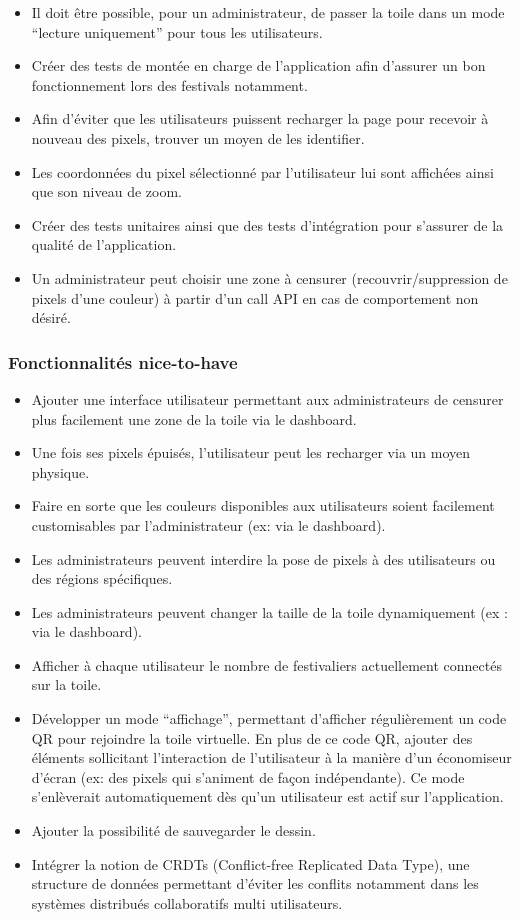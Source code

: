 \begin{itemize}
  \item Il doit être possible, pour un administrateur, de passer la toile dans un mode “lecture uniquement” pour tous les utilisateurs.
  \item Créer des tests de montée en charge de l'application afin d'assurer un bon fonctionnement lors des festivals notamment.
  \item Afin d'éviter que les utilisateurs puissent recharger la page pour recevoir à nouveau des pixels, trouver un moyen de les identifier.
  \item Les coordonnées du pixel sélectionné par l'utilisateur lui sont affichées ainsi que son niveau de zoom.
  \item Créer des tests unitaires ainsi que des tests d'intégration pour s'assurer de la qualité de l'application.
  \item Un administrateur peut choisir une zone à censurer (recouvrir/suppression de pixels d'une couleur) à partir d'un call API en cas de comportement non désiré.
\end{itemize}

\subsubsection{Fonctionnalités \guillemotleft nice-to-have\guillemotright}

\begin{itemize}
  \item Ajouter une interface utilisateur permettant aux administrateurs de censurer plus facilement une zone de la toile via le dashboard.
  \item Une fois ses pixels épuisés, l'utilisateur peut les recharger via un moyen physique.
  \item Faire en sorte que les couleurs disponibles aux utilisateurs soient facilement customisables par l'administrateur (ex: via le dashboard).
  \item Les administrateurs peuvent interdire la pose de pixels à des utilisateurs ou des régions spécifiques.
  \item Les administrateurs peuvent changer la taille de la toile dynamiquement (ex : via le dashboard).
  \item Afficher à chaque utilisateur le nombre de festivaliers actuellement connectés sur la toile.
  \item Développer un mode “affichage”, permettant d'afficher régulièrement un code QR pour rejoindre la toile virtuelle. En plus de ce code QR, ajouter des éléments sollicitant l'interaction de l'utilisateur à la manière d'un économiseur d'écran (ex: des pixels qui s'animent de façon indépendante). Ce mode s'enlèverait automatiquement dès qu'un utilisateur est actif sur l'application.
  \item Ajouter la possibilité de sauvegarder le dessin.
  \item Intégrer la notion de CRDTs (Conflict-free Replicated Data Type), une structure de données permettant d'éviter les conflits notamment dans les systèmes distribués collaboratifs multi utilisateurs.
\end{itemize}

